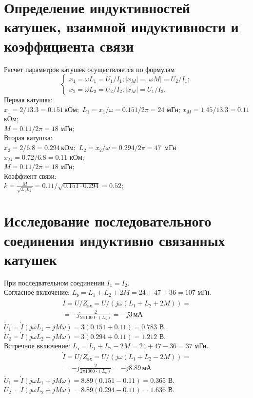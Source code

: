 \documentclass[a4paper,14pt ]{article} %
\begin{document}
\section{Определение индуктивностей катушек, взаимной индуктивности
и коэффициента связи}
Расчет параметров катушек осуществляется по формулам 
    \begin{equation}
        \begin{cases}
            x_1 = \omega L_1 = U_1/I_1;
            |x_M| = |\omega M| = U_2/I_1;\\
            x_2 = \omega L_2 = U_2/I_2; |x_M| = U_1/I_2.
        \end{cases}
    \end{equation}
    \indent Первая катушка:\\
    $x_1 = 2/13.3 = 0.151 \, \text{кОм}; $
    $L_1 = x_1/\omega = 0.151/2\pi = 24$ мГн;
    $x_M = 1.45/13.3 = 0.11$ кОм; \\
    $M = 0.11/2\pi = 18$ мГн;\\
    \indent Вторая катушка: \\
    $ x_2 = 2/6.8 = 0.294 \, \text{кОм};$ 
    $L_2 = x_2/\omega = 0.294/2\pi = 47$~мГн \\
    $x_M = 0.72/6.8 = 0.11$ кОм;\\ 
    $M = 0.11/2\pi = 18$ мГн; \\
    \indent Коэффиент связи:\\
    $k = \frac{M}{\sqrt{L_1 L_2}} = 0.11/\sqrt{0.151\cdot 0.294} = 0.52 $;
\section{Исследование последовательного соединения
индуктивно связанных катушек}
    При последвательном соединении $I_1 = I_2$.\\
    \indent Согласное включение:
    $L_{\text{э}} = L_1 + L_2 + 2M = 24 + 47 + 36 = 107 $ мГн.
    \begin{multline}
    \dot{I} = U/Z_{вх} = U/(j\omega(L_1 + L_2 + 2M)) = \\
    = -j\frac{2}{2\pi1000\cdot(L_{\text{э}})} = -j3\, \text{мА}
    \end{multline}
    $\dot{U}_1 = \dot{I}(j\omega L_1 + jM\omega) = 3(0.151+0.11) =0.783$ В.\\
    $\dot{U}_2 =\dot{I}(j\omega L_2 + jM\omega) = 3(0.294 +0.11) = 1.212$ В.\\
    \indent Встречное включение:
    $L_{\text{э}} = L_1 + L_2 - 2M = 24 + 47 - 36 = 37$ мГн. 
    \begin{multline}
    \dot{I} = U/Z_{вх} = U/(j\omega(L_1 + L_2 - 2M)) = \\
    = -j\frac{2}{2\pi1000\cdot(L_{\text{э}})} = -j8.89\, \text{мА}
    \end{multline}
    $\dot{U}_1 = \dot{I}(j\omega L_1 + jM\omega) = 8.89(0.151-0.11) = 0.365$ В.\\
    $\dot{U}_2 =\dot{I}(j\omega L_2 + jM\omega) = 8.89(0.294- 0.11) = 1.636$ В.\\
\end{document}
